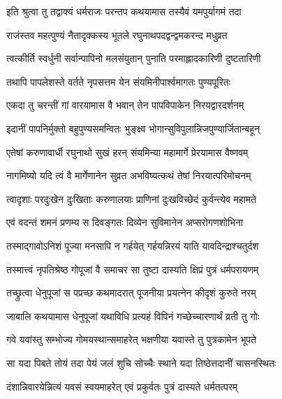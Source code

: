 \twolineshloka
{इति श्रुत्वा तु तद्वाक्यं धर्मराजः परन्तप}
{कथयामास तस्यैवं यमपुर्यागमं तदा}%


\twolineshloka
{राजंस्तव महत्पुण्यं नैतादृक्कस्य भूतले}
{रघुनाथपदद्वन्द्वमकरन्द मधुव्रत}%

\twolineshloka
{त्वत्कीर्ति स्वर्धुनी सर्वान्पापिनो मलसंयुतान्}
{पुनाति परमाह्लादकारिणी दुष्टतारिणी}%

\twolineshloka
{तथापि पापलेशस्ते वर्तते नृपसत्तम}
{येन संयमिनीपार्श्वमागतः पुण्यपूरितः}%

\twolineshloka
{एकदा तु चरन्तीं गां वारयामास वै भवान्}
{तेन पापविपाकेन निरयद्वारदर्शनम्}%

\twolineshloka
{इदानीं पापनिर्मुक्तो बहुपुण्यसमन्वितः}
{भुङ्क्ष्व भोगान्सुविपुलान्निजपुण्यार्जितान्बहून्}%

\twolineshloka
{एतेषां करुणावार्धी रघुनाथो सुखं हरन्}
{संयमिन्या महामार्गे प्रेरयामास वैष्णवम्}%

\twolineshloka
{नागमिष्यो यदि त्वं वै मार्गेणानेन सुव्रत}
{अभविष्यत्कथं तेषां निरयात्परिमोचनम्}%

\twolineshloka
{त्वादृशाः परदुःखेन दुःखिताः करुणालयाः}
{प्राणिनां दुःखविच्छेदं कुर्वन्त्येव महामते}%


\twolineshloka
{एवं वदन्तं शमनं प्रणम्य स दिवङ्गतः}
{दिव्येन सुविमानेन अप्सरोगणशोभिना}%

\twolineshloka
{तस्माद्गावोऽनिशं पूज्या मनसापि न गर्हयेत्}
{गर्हयन्निरयं याति यावदिन्द्राश्चतुर्दश}%

\twolineshloka
{तस्मात्त्वं नृपतिश्रेष्ठ गोपूजां वै समाचर}
{सा तुष्टा दास्यति क्षिप्रं पुत्रं धर्मपरायणम्}%


\twolineshloka
{तच्छ्रुत्वा धेनुपूजां स पप्रच्छ कथमादरात्}
{पूजनीया प्रयत्नेन कीदृशं कुरुते नरम्}%

\twolineshloka
{जाबालि कथयामास धेनुपूजां यथाविधि}
{प्रत्यहं विपिनं गच्छेच्चारणार्थं व्रती तु गोः}%

\twolineshloka
{गवे यवांस्तु सम्भोज्य गोमयस्थान्समाहरेत्}
{भक्षणीया यवास्ते तु पुत्रकामेन भूपते}%

\twolineshloka
{सा यदा पिबते तोयं तदा पेयं जलं शुचि}
{सोच्चैः स्थाने यदा तिष्ठेत्तदानीं चासनस्थितः}%

\twolineshloka
{दंशान्निवारयेन्नित्यं यवसं स्वयमाहरेत्}
{एवं प्रकुर्वतः पुत्रं दास्यते धर्मतत्परम्}%


